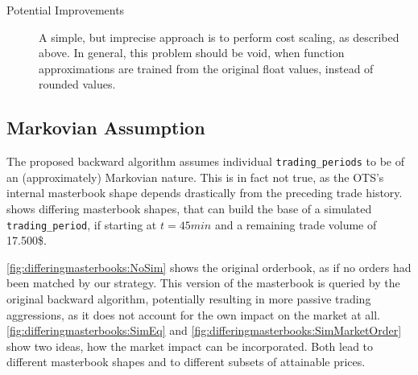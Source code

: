 \begin{description}
\item[Potential Improvements]  A simple, but imprecise approach is to perform cost scaling, as described above. In general, this problem should be void, when function approximations are trained from the original float values, instead of rounded values.
\end{description}


\subsection{Markovian Assumption}
The proposed backward algorithm assumes individual \lstinline!trading_periods! to be of an (approximately) Markovian nature. This is in fact not true, as the \ac{OTS}'s internal masterbook shape depends drastically from the preceding trade history.\\

 shows differing masterbook shapes, that can build the base of a simulated \lstinline!trading_period!, \eg if starting at $t=45min$ and a remaining trade volume of 17.500\$.

\ref{fig:differingmasterbooks:NoSim} shows the original orderbook, as if no orders had been matched by our strategy. This version of the masterbook is queried by the original backward algorithm, potentially resulting in more passive trading aggressions, as it does not account for the own impact on the market at all. \ref{fig:differingmasterbooks:SimEq} and \ref{fig:differingmasterbooks:SimMarketOrder} show two ideas, how the market impact can be incorporated. Both lead to different masterbook shapes and to different subsets of attainable prices.\\


